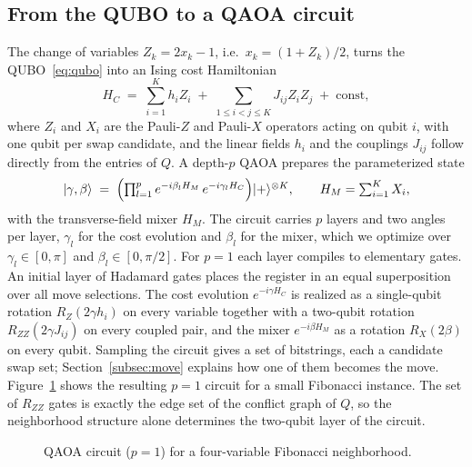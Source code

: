 \documentclass{svproc}
\newcommand{\rev}[1]{{\color{blue}#1}}
\newcommand{\rev}[1]{#1}
\begin{document}
\subsection{From the QUBO to a QAOA circuit}
\label{subsec:circuit}
The change of variables $Z_k=2x_k-1$, i.e.\ $x_k=(1+Z_k)/2$, turns the
QUBO~\eqref{eq:qubo} into an Ising cost
Hamiltonian~\cite{lucas2014ising}
\begin{equation}
  H_C \;=\; \sum_{i=1}^{K} h_i Z_i \;+\; \sum_{1\le i<j\le K} J_{ij} Z_i Z_j
  \;+\; \mathrm{const},
  \label{eq:ising}
\end{equation}
where $Z_i$ and $X_i$ are the Pauli-$Z$ and Pauli-$X$ operators acting on
qubit $i$, with one qubit per swap candidate, and the linear fields $h_i$ and
the couplings $J_{ij}$ follow directly from the entries of $Q$. A depth-$p$ QAOA prepares the parameterized
state
\begin{equation}
  \lvert\gamma,\beta\rangle \;=\;
  \Bigl(\textstyle\prod_{l=1}^{p}
        e^{-i\beta_l H_M}\,e^{-i\gamma_l H_C}\Bigr)
  \lvert +\rangle^{\otimes K},
  \qquad H_M=\sum_{i=1}^{K} X_i,
  \label{eq:qaoa}
\end{equation}
with the transverse-field mixer $H_M$. The circuit carries $p$ layers and two
angles per layer, $\gamma_l$ for the cost evolution and $\beta_l$ for the
mixer, which we optimize over $\gamma_l\in[0,\pi]$ and
$\beta_l\in[0,\pi/2]$. For $p=1$ each layer compiles to elementary gates. An initial layer of Hadamard gates places the register
in an equal superposition over all move selections. The cost evolution
$e^{-i\gamma H_C}$ is realized as a single-qubit rotation
$R_Z(2\gamma h_i)$ on every variable together with a two-qubit rotation
$R_{ZZ}(2\gamma J_{ij})$ on every coupled pair, and the mixer
$e^{-i\beta H_M}$ as a rotation $R_X(2\beta)$ on every qubit. \rev{Sampling
the circuit gives a set of bitstrings, each a candidate swap set;
Section~\ref{subsec:move} explains how one of them becomes the move.} Figure~\ref{fig:qaoa_fib}
shows the resulting $p=1$ circuit for a small Fibonacci instance. The set
of $R_{ZZ}$ gates is exactly the edge set of the conflict graph of $Q$,
so the neighborhood structure alone determines the two-qubit layer of the
circuit.

\begin{figure}[htb]
\centering

\caption{QAOA circuit ($p=1$) for a four-variable Fibonacci neighborhood.}
\label{fig:qaoa_fib}
\end{figure}
\end{document}
